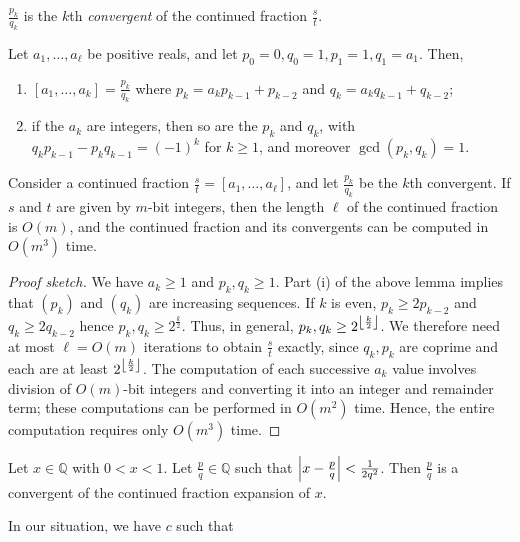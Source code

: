 \( \frac{p_k}{q_k} \) is the \( k \)th \emph{convergent} of the continued fraction \( \frac{s}{t} \).
\begin{lemma}
    Let \( a_1, \dots, a_\ell \) be positive reals, and let \( p_0 = 0, q_0 = 1, p_1 = 1, q_1 = a_1 \).
    Then,
    \begin{enumerate}
        \item \( [a_1, \dots, a_k] = \frac{p_k}{q_k} \) where \( p_k = a_k p_{k-1} + p_{k-2} \) and \( q_k = a_k q_{k-1} + q_{k-2} \);
        \item if the \( a_k \) are integers, then so are the \( p_k \) and \( q_k \), with \( q_k p_{k-1} - p_k q_{k-1} = (-1)^k \) for \( k \geq 1 \), and moreover \( \gcd(p_k, q_k) = 1 \).
    \end{enumerate}
\end{lemma}
\begin{theorem}
    Consider a continued fraction \( \frac{s}{t} = [a_1, \dots, a_\ell] \), and let \( \frac{p_k}{q_k} \) be the \( k \)th convergent.
    If \( s \) and \( t \) are given by \( m \)-bit integers, then the length \( \ell \) of the continued fraction is \( O(m) \), and the continued fraction and its convergents can be computed in \( O(m^3) \) time.
\end{theorem}
\begin{proof}[Proof sketch]
    We have \( a_k \geq 1 \) and \( p_k, q_k \geq 1 \).
    Part (i) of the above lemma implies that \( (p_k) \) and \( (q_k) \) are increasing sequences.
    If \( k \) is even, \( p_k \geq 2p_{k-2} \) and \( q_k \geq 2q_{k-2} \) hence \( p_k, q_k \geq 2^{\frac{k}{2}} \).
    Thus, in general, \( p_k, q_k \geq 2^{\floor*{\frac{k}{2}}} \).
    We therefore need at most \( \ell = O(m) \) iterations to obtain \( \frac{s}{t} \) exactly, since \( q_k, p_k \) are coprime and each are at least \( 2^{\floor*{\frac{k}{2}}} \).
    The computation of each successive \( a_k \) value involves division of \( O(m) \)-bit integers and converting it into an integer and remainder term; these computations can be performed in \( O(m^2) \) time.
    Hence, the entire computation requires only \( O(m^3) \) time.
\end{proof}
\begin{theorem}
    Let \( x \in \mathbb Q \) with \( 0 < x < 1 \).
    Let \( \frac{p}{q} \in \mathbb Q \) such that \( \abs{x - \frac{p}{q}} < \frac{1}{2q^2} \).
    Then \( \frac{p}{q} \) is a convergent of the continued fraction expansion of \( x \).
\end{theorem}
In our situation, we have \( c \) such that
